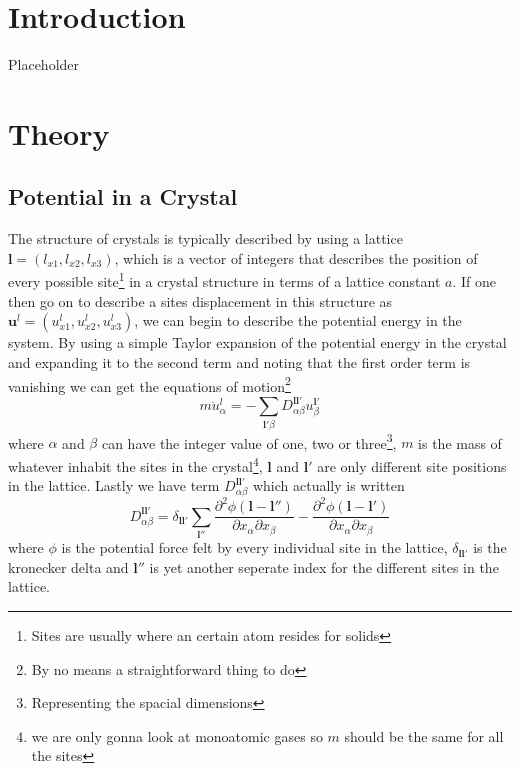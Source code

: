 \documentclass[11pt]{article}
\begin{document}
\section{Introduction}
Placeholder
\section{Theory}
\subsection{Potential in a Crystal}
The structure of crystals is typically described by using a lattice $\mathbf{l} = (l_{x1}, l_{x2}, l_{x3})$, which is a vector of integers that describes the position of every possible site\footnote{Sites are usually where an certain atom resides for solids} in a crystal structure in terms of a lattice constant $a$. If one then go on to describe a sites displacement in this structure as $\mathbf{u}^l = (u^l_{x1},u^l_{x2},u^l_{x3})$, we can begin to describe the potential energy in the system. By using a simple Taylor expansion of the potential energy in the crystal and expanding it to the second term and noting that the first order term is vanishing we can get the equations of motion\footnote{By no means a straightforward thing  to do} 
\begin{equation}
	m \ddot{u}^l_{\alpha} = - \sum_{\mathbf{l}'\beta} D^{\mathbf{l}\mathbf{l}'}_{\alpha \beta} u^{\mathbf{l}'}_{\beta}
	\label{eq:motion}
\end{equation}
where $\alpha$ and $\beta$ can have the integer value of one, two or three\footnote{Representing the spacial dimensions}, $m$ is the mass of whatever inhabit the sites in the crystal\footnote{we are only gonna look at monoatomic gases so $m$ should be the same for all the sites}, $\mathbf{l}$ and $\mathbf{l}'$ are only different site positions in the lattice. Lastly we have term $D^{\mathbf{l}\mathbf{l}'}_{\alpha \beta}$ which actually is written
\begin{equation}
	D^{\mathbf{l}\mathbf{l}'}_{\alpha \beta} = \delta_{\mathbf{l} \mathbf{l}'} \sum_{\mathbf{l}''} \frac{\partial^2 \phi (\mathbf{l}-\mathbf{l}'')}{\partial x_{\alpha} \partial x_{\beta}}
	-
	\frac{\partial^2 \phi (\mathbf{l}-\mathbf{l}')}{\partial x_{\alpha} \partial x_{\beta}}
\end{equation}
where $\phi$ is the potential force felt by every individual site in the lattice, $\delta_{\mathbf{l}\mathbf{l}'}$ is the kronecker delta and $\mathbf{l}''$ is yet another seperate index for the different sites in the lattice.
\end{document}
